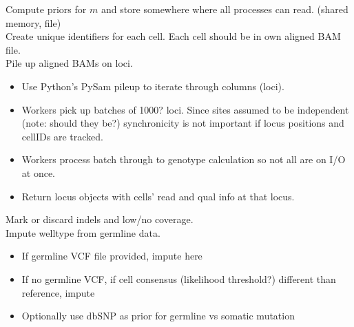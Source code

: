 \documentclass[../../main.tex]{subfiles}
\begin{document}
Compute priors for $m$ and store somewhere where all processes can read. (shared memory, file)\\[1em]
Create unique identifiers for each cell. Each cell should be in own aligned BAM file.\\[1em]
Pile up aligned BAMs on loci.
\begin{itemize}
    \item Use Python's PySam pileup to iterate through columns (loci).
    \item Workers pick up batches of 1000? loci. Since sites assumed to be independent (note: should they be?) synchronicity is not important if locus positions and cellIDs are tracked.
    \item Workers process batch through to genotype calculation so not all are on I/O at once.
    \item Return locus objects with cells' read and qual info at that locus.
\end{itemize}
\vspace{1em}
Mark or discard indels and low/no coverage.\\[1em]
Impute welltype from germline data.
\begin{itemize}
    \item If germline VCF file provided, impute here
    \item If no germline VCF, if cell consensus (likelihood threshold?) different than reference, impute
    \item Optionally use dbSNP as prior for germline vs somatic mutation
\end{itemize}
\end{document}
